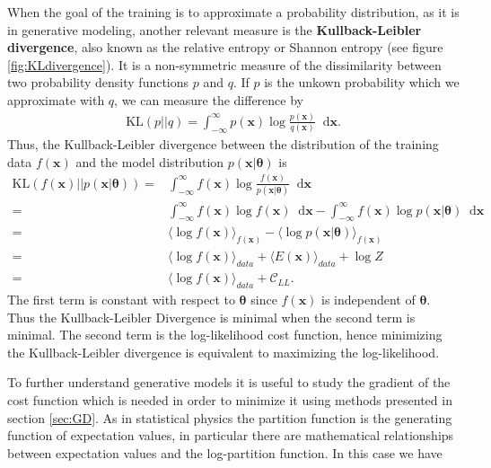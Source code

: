 \documentclass[twoside,english]{uiofysmaster}
\newcommand*\dif{\mathop{}\!\mathrm{d}}
\begin{document}
When the goal of the training is to approximate a probability distribution, as it is in generative modeling, another relevant measure is the \textbf{Kullback-Leibler divergence}, also known as the relative entropy or Shannon entropy (see figure \ref{fig:KLdivergence}). It is a non-symmetric measure of the dissimilarity between two probability density functions $p$ and $q$. If $p$ is the unkown probability which we approximate with $q$, we can measure the difference by
\begin{align}
	\text{KL}(p||q) = \int_{-\infty}^{\infty} p (\bm{x}) \log \frac{p(\bm{x})}{q(\bm{x})} \dif \bm{x}.
\end{align}
Thus, the Kullback-Leibler divergence between the distribution of the training data $f(\bm{x})$ and the model distribution $p(\bm{x}| \bm{\theta})$ is
\begin{align}
	\text{KL} (f(\bm{x})|| p(\bm{x}| \bm{\theta})) =& \int_{-\infty}^{\infty}
	f (\bm{x}) \log \frac{f(\bm{x})}{p(\bm{x}| \bm{\theta})} \dif \bm{x} \\
	=& \int_{-\infty}^{\infty} f(\bm{x}) \log f(\bm{x}) \dif \bm{x} - \int_{-\infty}^{\infty} f(\bm{x}) \log
	p(\bm{x}| \bm{\theta}) \dif \bm{x} \\
	=& \langle \log f(\bm{x}) \rangle_{f(\bm{x})} - \langle \log p(\bm{x}| \bm{\theta}) \rangle_{f(\bm{x})} \\
	=& \langle \log f(\bm{x}) \rangle_{data} + \langle E(\bm{x}) \rangle_{data} + \log Z \\
	=& \langle \log f(\bm{x}) \rangle_{data} + \mathcal{C}_{LL} .
\end{align}
The first term is constant with respect to $\bm{\theta}$ since $f(\bm{x})$ is independent of $\bm{\theta}$. Thus the Kullback-Leibler Divergence is minimal when the second term is minimal. The second term is the log-likelihood cost function, hence minimizing the Kullback-Leibler divergence is equivalent to maximizing the log-likelihood.

To further understand generative models it is useful to study the gradient of the cost function which is needed in order to minimize it using methods presented in section \ref{sec:GD}. As in statistical physics the partition function is the generating function of expectation values, in particular there are mathematical relationships between expectation values and the log-partition function. In this case we have \cite{Mehta2018}
\end{document}
